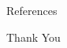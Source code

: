 \documentclass{beamer}
\begin{document}
\begin{frame}{References}
\nocite{*}


\end{frame}


\begin{frame}
\Huge{\centerline{Thank You}}
\end{frame}

\end{document}
